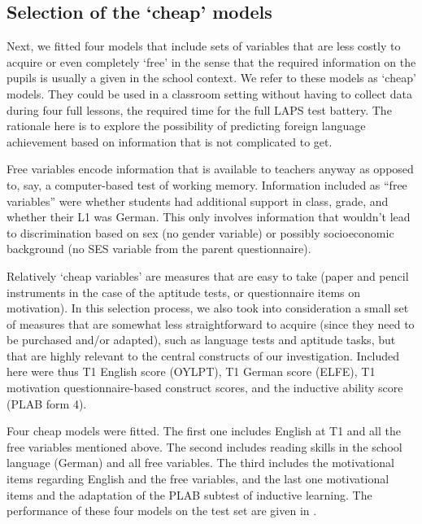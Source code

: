 \documentclass[output=paper]{langsci/langscibook}
\begin{document}
\subsection{Selection of the ‘cheap’ models}

Next, we fitted four models that include sets of variables that are less costly to acquire or even completely ‘free’ in the sense that the required information on the pupils is usually a given in the school context. We refer to these models as ‘cheap’ models. They could be used in a classroom setting without having to collect data during four full lessons, the required time for the full LAPS test battery. The rationale here is to explore the possibility of predicting foreign language achievement based on information that is not complicated to get. 

Free variables encode information that is available to teachers anyway as opposed to, say, a computer-based test of working memory. Information included as “free variables” were whether students had additional support in class, grade, and whether their L1 was German. This only involves information that wouldn’t lead to discrimination based on sex (no gender variable) or possibly socioeconomic background (no SES variable from the parent questionnaire). 

Relatively ‘cheap variables’ are measures that are easy to take (paper and pencil instruments in the case of the aptitude tests, or questionnaire items on motivation). In this selection process, we also took into consideration a small set of measures that are somewhat less straightforward to acquire (since they need to be purchased and/or adapted), such as language tests and aptitude tasks, but that are highly relevant to the central constructs of our investigation. Included here were thus T1 English score (OYLPT), T1 German score (ELFE), T1 motivation questionnaire-based construct scores, and the inductive ability score (PLAB form 4).

Four cheap models were fitted. The first one includes English at T1 and all the free variables mentioned above. The second includes reading skills in the school language (German) and all free variables. The third includes the motivational items regarding English and the free variables, and the last one motivational items and the adaptation of the PLAB subtest of inductive learning. The performance of these four models on the test set are given in . 
\end{document}
